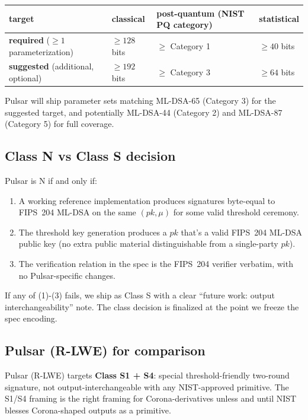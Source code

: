 \begin{center}
\begin{tabular}{llll}
\toprule
target & classical & post-quantum (NIST PQ category) & statistical \\
\midrule
\textbf{required} ($\ge 1$ parameterization) & $\ge 128$ bits &
  $\ge$ Category 1 & $\ge 40$ bits \\
\textbf{suggested} (additional, optional) & $\ge 192$ bits &
  $\ge$ Category 3 & $\ge 64$ bits \\
\bottomrule
\end{tabular}
\end{center}

Pulsar will ship parameter sets matching ML-DSA-65 (Category 3)
for the suggested target, and potentially ML-DSA-44 (Category 2) and
ML-DSA-87 (Category 5) for full coverage.

\subsection{Class N vs Class S decision}

Pulsar is N if and only if:

\begin{enumerate}[leftmargin=*, itemsep=0pt]
\item A working reference implementation produces signatures
byte-equal to FIPS~204 ML-DSA on the same $(\mathit{pk}, \mu)$ for
some valid threshold ceremony.
\item The threshold key generation produces a $\mathit{pk}$ that's a
valid FIPS~204 ML-DSA public key (no extra public material
distinguishable from a single-party $\mathit{pk}$).
\item The verification relation in the spec is the FIPS~204 verifier
verbatim, with no Pulsar-specific changes.
\end{enumerate}

If any of (1)-(3) fails, we ship as Class S with a clear ``future
work: output interchangeability'' note. The class decision is
finalized at the point we freeze the spec encoding.

\subsection{Pulsar (R-LWE) for comparison}

Pulsar (R-LWE) targets \textbf{Class S1 + S4}: special
threshold-friendly two-round signature, not output-interchangeable
with any NIST-approved primitive. The S1/S4 framing is the right
framing for Corona-derivatives unless and until NIST blesses
Corona-shaped outputs as a primitive.

